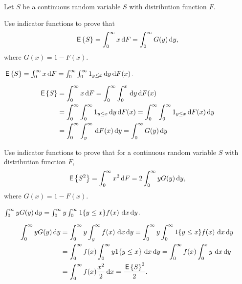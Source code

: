 Let $S$ be a continuous random variable $S$ with distribution function $F$.

\begin{exercise}
 Use indicator functions to prove that 
\begin{equation*}
    \,\mathsf{E}\left\{S\right\} = \int_0^\infty x \,\text{d}F  = \int_0^\infty G(y) \,\text{d}y,
\end{equation*}
where $G(x) = 1 - F(x)$. 
\begin{hint}
$\,\mathsf{E}\left\{S\right\} = \int_0^\infty x \,\text{d}F  = \int_0^\infty \int_0^\infty 1_{y\leq x} \,\text{d}y \,\text{d}F(x)$.
\end{hint}
\begin{solution}
\begin{equation*}
  \begin{split}
    \,\mathsf{E}\left\{S\right\} &= \int_0^\infty x \,\text{d}F  = \int_0^\infty \int_0^x \,\text{d}y \,\text{d}F(x) \\
    & = \int_0^\infty \int_0^\infty 1_{y\leq x} \,\text{d}y \,\text{d}F(x)   = \int_0^\infty \int_0^\infty 1_{y\leq x} \,\text{d}F(x) \,\text{d}y\\
    & = \int_0^\infty \int_y^\infty \,\text{d}F(x) \,\text{d}y = \int_0^\infty G(y) \,\text{d}y
  \end{split}
\end{equation*}
\end{solution}
\end{exercise}

\begin{exercise}
 Use indicator functions to prove that for  a continuous random
    variable $S$ with distribution function $F$, 
\begin{equation*}
    \,\mathsf{E}\left\{S^2\right\} = \int_0^\infty x^2 \,\text{d}F  = 2 \int_0^\infty y G(y) \,\text{d}y,
\end{equation*}
where $G(x) = 1 - F(x)$. 
\begin{hint}
$\int_0^\infty y G(y) \,\text{d}y = \int_0^\infty y \int_0^\infty 1\{y\leq x\}f(x)\, \,\text{d}x \,\text{d}y$.
\end{hint}
\begin{solution}
  \begin{equation*}
    \begin{split}
\int_0^\infty y G(y) \,\text{d}y 
&=  \int_0^\infty y \int_y^\infty f(x)\, \,\text{d}x \,\text{d}y =  \int_0^\infty y \int_0^\infty 1\{y\leq x\}f(x)\, \,\text{d}x \,\text{d}y\\
&=  \int_0^\infty f(x) \int_0^\infty y 1\{y \leq x\}\, \,\text{d}x \,\text{d}y
=  \int_0^\infty f(x) \int_0^x y\, \,\text{d}x \,\text{d}y\\
&=  \int_0^\infty f(x) \frac{x^2}2 \,\text{d}x =\frac{\,\mathsf{E}\left\{S\right\}^2}2.
    \end{split}
  \end{equation*}
\end{solution}
\end{exercise}

